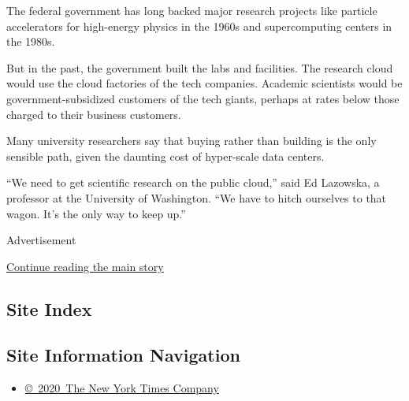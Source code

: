 The federal government has long backed major research projects like
particle accelerators for high-energy physics in the 1960s and
supercomputing centers in the 1980s.

But in the past, the government built the labs and facilities. The
research cloud would use the cloud factories of the tech companies.
Academic scientists would be government-subsidized customers of the tech
giants, perhaps at rates below those charged to their business
customers.

Many university researchers say that buying rather than building is the
only sensible path, given the daunting cost of hyper-scale data centers.

``We need to get scientific research on the public cloud,'' said Ed
Lazowska, a professor at the University of Washington. ``We have to
hitch ourselves to that wagon. It's the only way to keep up.''

Advertisement

\protect\hyperlink{after-bottom}{Continue reading the main story}

\hypertarget{site-index}{%
\subsection{Site Index}\label{site-index}}

\hypertarget{site-information-navigation}{%
\subsection{Site Information
Navigation}\label{site-information-navigation}}

\begin{itemize}
\tightlist
\item
  \href{https://help.nytimes.com/hc/en-us/articles/115014792127-Copyright-notice}{©~2020~The
  New York Times Company}
\end{itemize}


